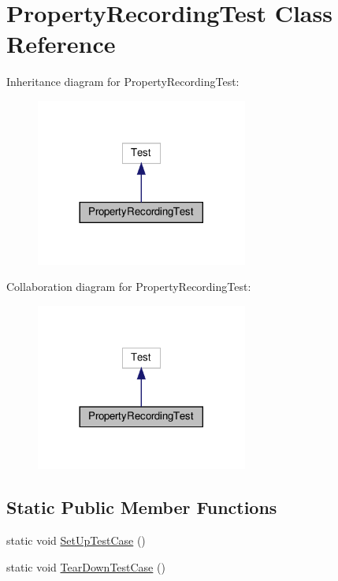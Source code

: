 \hypertarget{class_property_recording_test}{}\section{Property\+Recording\+Test Class Reference}
\label{class_property_recording_test}


Inheritance diagram for Property\+Recording\+Test\+:
\nopagebreak
\begin{figure}[H]
\begin{center}
\leavevmode
\includegraphics[width=197pt]{class_property_recording_test__inherit__graph}
\end{center}
\end{figure}


Collaboration diagram for Property\+Recording\+Test\+:
\nopagebreak
\begin{figure}[H]
\begin{center}
\leavevmode
\includegraphics[width=197pt]{class_property_recording_test__coll__graph}
\end{center}
\end{figure}
\subsection*{Static Public Member Functions}
\begin{DoxyCompactItemize}
\item 
static void \hyperlink{class_property_recording_test_a673c9dfcd9f0c8d10d0df765852c1669}{Set\+Up\+Test\+Case} ()
\item 
static void \hyperlink{class_property_recording_test_ac0d2d47efbdc4399777dffca6071d15d}{Tear\+Down\+Test\+Case} ()
\end{DoxyCompactItemize}


